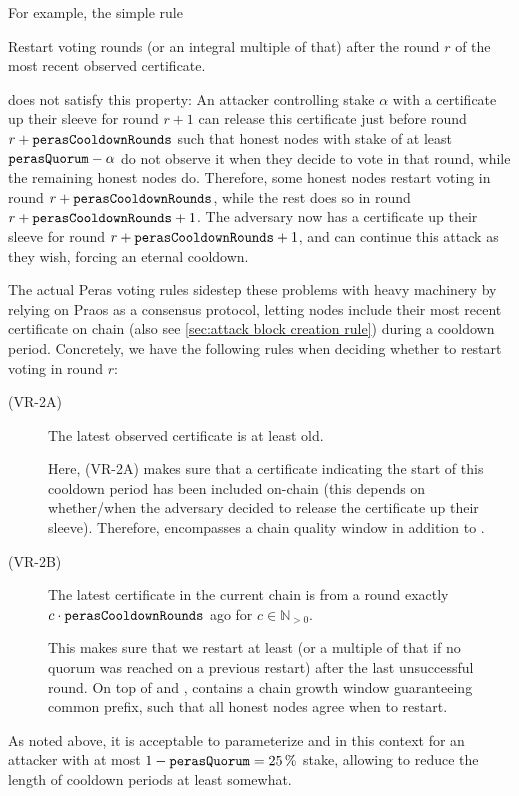 For example, the simple rule
\begin{tcolorbox}
  Restart voting \perasCooldownRounds{} rounds (or an integral multiple of that) after the round $r$ of the most recent observed certificate.
\end{tcolorbox}
\parindent0pt
does not satisfy this property:
An attacker controlling stake $\alpha$ with a certificate up their sleeve for round $r+1$ can release this certificate just before round $r+\mathtt{perasCooldownRounds}$ such that honest nodes with stake of at least $\mathtt{perasQuorum} - \alpha$ do not observe it when they decide to vote in that round, while the remaining honest nodes do.
Therefore, some honest nodes restart voting in round $r+\mathtt{perasCooldownRounds}$, while the rest does so in round $r+\mathtt{perasCooldownRounds}+1$.
The adversary now has a certificate up their sleeve for round $r+\mathtt{perasCooldownRounds}+1$, and can continue this attack as they wish, forcing an eternal cooldown.

The actual Peras voting rules sidestep these problems with heavy machinery by relying on Praos as a consensus protocol, letting nodes include their most recent certificate on chain (also see \cref{sec:attack block creation rule}) during a cooldown period.
Concretely, we have the following rules when deciding whether to restart voting in round $r$:
\begin{description}
\item[(VR-2A)] The latest observed certificate is at least \perasIgnoranceRounds{} old.

  Here, (VR-2A) makes sure that a certificate indicating the start of this cooldown period has been included on-chain (this depends on whether/when the adversary decided to release the certificate up their sleeve).
  Therefore, \perasIgnoranceRounds{} encompasses a chain quality window \Tcq{} in addition to \Theal{}.
\item[(VR-2B)] The latest certificate in the current chain is from a round exactly $c\cdot \mathtt{perasCooldownRounds}$ ago for $c \in\mathbb{N}_{>0}$.

  This makes sure that we restart at least \perasCooldownRounds{} (or a multiple of that if no quorum was reached on a previous restart) after the last unsuccessful round.
  On top of \Theal{} and \Tcq{}, \perasCooldownRounds{} contains a chain growth window \Tcp{} guaranteeing common prefix, such that all honest nodes agree when to restart.
\end{description}

As noted above, it is acceptable to parameterize \Tcq{} and \Tcp{} in this context for an attacker with at most $1-\mathtt{perasQuorum}{} = \qty{25}{\percent}$ stake, allowing to reduce the length of cooldown periods at least somewhat.

